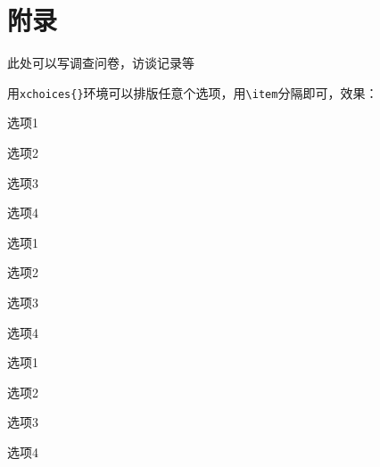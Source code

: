 \chapter*{附录}

此处可以写调查问卷，访谈记录等

用\verb|xchoices{}|环境可以排版任意个选项，用\verb|\item|分隔即可，效果：

\begin{xchoices}
  \item 选项1
  \item 选项2
  \item 选项3
  \item 选项4
\end{xchoices}

\begin{xchoices}[
  items = 2,            %
  label-style = alph,   %
  pre-label = {(},      %
  post-label = {)},     %
]
  \item 选项1
  \item 选项2
  \item 选项3
  \item 选项4
\end{xchoices}

\begin{xchoices}[label-style = quan]
  \item 选项1
  \item 选项2
  \item 选项3
  \item 选项4
\end{xchoices}